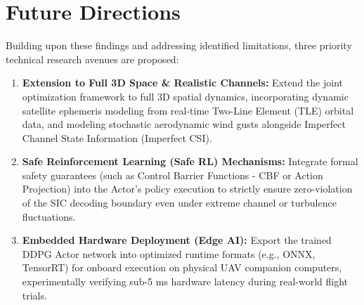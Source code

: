\section{Future Directions}
\label{sec:future_directions}

Building upon these findings and addressing identified limitations, three priority technical research avenues are proposed:
\begin{enumerate}
    \item \textbf{Extension to Full 3D Space \& Realistic Channels:} Extend the joint optimization framework to full 3D spatial dynamics, incorporating dynamic satellite ephemeris modeling from real-time Two-Line Element (TLE) orbital data, and modeling stochastic aerodynamic wind gusts alongside Imperfect Channel State Information (Imperfect CSI).
    \item \textbf{Safe Reinforcement Learning (Safe RL) Mechanisms:} Integrate formal safety guarantees (such as Control Barrier Functions - CBF or Action Projection) into the Actor's policy execution to strictly ensure zero-violation of the SIC decoding boundary even under extreme channel or turbulence fluctuations.
    \item \textbf{Embedded Hardware Deployment (Edge AI):} Export the trained DDPG Actor network into optimized runtime formats (e.g., ONNX, TensorRT) for onboard execution on physical UAV companion computers, experimentally verifying sub-5 ms hardware latency during real-world flight trials.
\end{enumerate}

